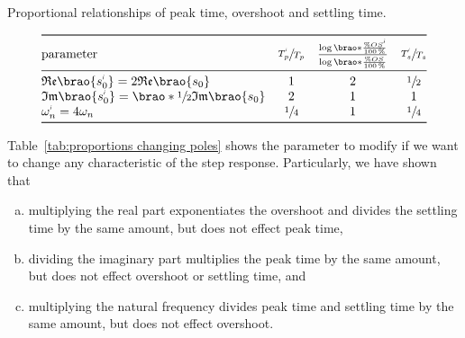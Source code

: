 \documentclass[12pt]{article}
\DeclarePairedDelimiter\brao()%
\newcommand{\setprime}[2][1]{%
    {#2}^{%
        \raisebox{1pt}{%
            \scalebox{0.5}{%
                \itshape\sffamily\uppercase%
                \expandafter{%
                    \romannumeral#1%
                }%
            }%
        }
    }%
}%
\begin{document}
\begin{table}[]
    \centering
    \caption{Proportional relationships of peak time, overshoot and settling time.}
    \[
        \begin{array}{@{}l*3c@{}}
        \toprule
            \text{parameter}
                & \sfrac{\setprime{T}_p}{T_p}
                & \frac{\log\brao*{\frac{\%\setprime{OS}}{\SI{100}\percent}}}{\log{\brao*{\frac{\%OS^{\vphantom1}}{\SI{100}\percent}}}}
                & \sfrac{\setprime{T}_s}{T_s}
        \\*
        \midrule
            \mathfrak{Re}\brao{\setprime{s}_0} = 2\mathfrak{Re}\brao{s_0}
            & 1
            & 2
            & \sfrac12
        \\*
            \mathfrak{Im}\brao{\setprime{s}_0} = \brao*{\sfrac12}\mathfrak{Im}\brao{s_0}
            & 2
            & 1
            & 1
        \\*
            \setprime\omega_n = 4\omega_n
            & \sfrac14
            & 1
            & \sfrac14
        \\*
        \bottomrule
        \end{array}
    \]
    \label{tab:proportions changing poles}
\end{table}

Table~\ref{tab:proportions changing poles} shows the parameter to modify if we want to change any characteristic of the step response. Particularly, we have shown that
\begin{enumerate}[(a)]
    \addtocounter{enumi}1
    \item
        multiplying the real part exponentiates the overshoot and divides the settling time by the same amount, but does not effect peak time,
    \item
        dividing the imaginary part multiplies the peak time by the same amount, but does not effect overshoot or settling time, and
    \item
        multiplying the natural frequency divides peak time and settling time by the same amount, but does not effect overshoot.
\end{enumerate}
\end{document}

